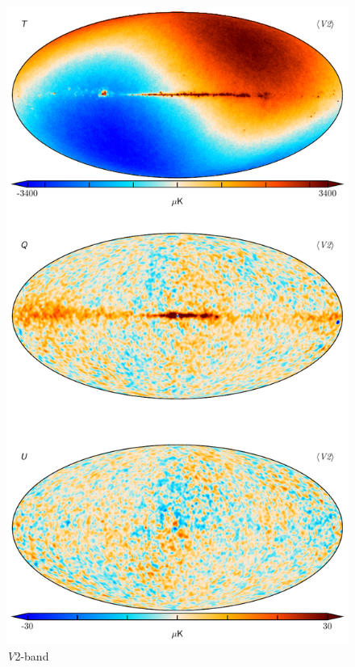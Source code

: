 \documentclass[twocolumn]{../../common/aa}
\newcommand{\V}[0]{\textit V}
\begin{document}
\begin{figure}
	\centering
	\includegraphics[height=0.9\textheight]{figures/060-WMAP_V2_map.pdf}
	\caption{\V2-band}
\end{figure}
\end{document}

